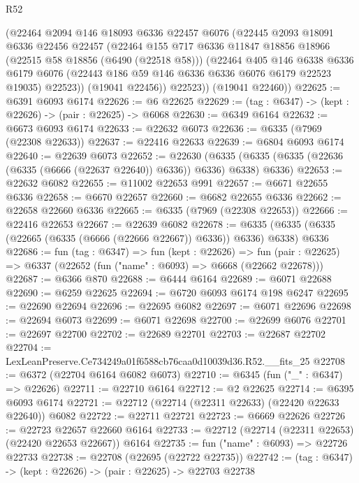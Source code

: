 \begin{lexlean}{R52}
\begin{coremodule}
        (@22464
          @2094
          @146
          @18093
          @6336
          @22457
          @6076
          (@22445
            @2093
            @18091
            @6336
            @22456
            @22457
            (@22464
              @155
              @717
              @6336
              @11847
              @18856
              @18966
              (@22515 @58 @18856 (@6490 (@22518 @58)))
              (@22464
                @405
                @146
                @6338
                @6336
                @6179
                @6076
                (@22443 @186 @59 @146 @6336 @6336 @6076 @6179 @22523 @19035)
                @22523))
            (@19041 @22456))
          @22523))
      (@19041 @22460))
@22625 := @6391 @6093 @6174
@22626 := @6 @22625
@22629 := (tag : @6347) -> (kept : @22626) -> (pair : @22625) -> @6068
@22630 := @6349 @6164
@22632 := @6673 @6093 @6174
@22633 := @22632 @6073
@22636 := @6335 (@7969 (@22308 @22633))
@22637 := @22416 @22633
@22639 := @6804 @6093 @6174
@22640 := @22639 @6073
@22652 := @22630
    (@6335 (@6335 (@6335 (@22636 (@6335 (@6666 (@22637 @22640)) @6336)) @6336) @6338) @6336)
@22653 := @22632 @6082
@22655 := @11002 @22653 @991
@22657 := @6671 @22655 @6336
@22658 := @6670 @22657
@22660 := @6682 @22655 @6336
@22662 := @22658 @22660 @6336
@22665 := @6335 (@7969 (@22308 @22653))
@22666 := @22416 @22653
@22667 := @22639 @6082
@22678 := @6335 (@6335 (@6335 (@22665 (@6335 (@6666 (@22666 @22667)) @6336)) @6336) @6338) @6336
@22686 := fun (tag : @6347) =>
  fun (kept : @22626) =>
  fun (pair : @22625) => @6337 (@22652 (fun ("name" : @6093) => @6668 (@22662 @22678)))
@22687 := @6366 @870
@22688 := @6444 @6164
@22689 := @6071 @22688
@22690 := @6259 @22625
@22694 := @6720 @6093 @6174 @198 @6247
@22695 := @22690 @22694
@22696 := @22695 @6082
@22697 := @6071 @22696
@22698 := @22694 @6073
@22699 := @6071 @22698
@22700 := @22699 @6076
@22701 := @22697 @22700
@22702 := @22689 @22701
@22703 := @22687 @22702
@22704 := LexLeanPreserve.Ce734249a01f6588cb76caa0d10039d36.R52.__fits_25
@22708 := @6372 (@22704 @6164 @6082 @6073)
@22710 := @6345 (fun ("_" : @6347) => @22626)
@22711 := @22710 @6164
@22712 := @2 @22625
@22714 := @6395 @6093 @6174
@22721 := @22712 (@22714 (@22311 @22633) (@22420 @22633 @22640)) @6082
@22722 := @22711 @22721
@22723 := @6669 @22626
@22726 := @22723 @22657 @22660 @6164
@22733 := @22712 (@22714 (@22311 @22653) (@22420 @22653 @22667)) @6164
@22735 := fun ("name" : @6093) => @22726 @22733
@22738 := @22708 (@22695 (@22722 @22735))
@22742 := (tag : @6347) -> (kept : @22626) -> (pair : @22625) -> @22703 @22738

\end{coremodule}
\end{lexlean}
